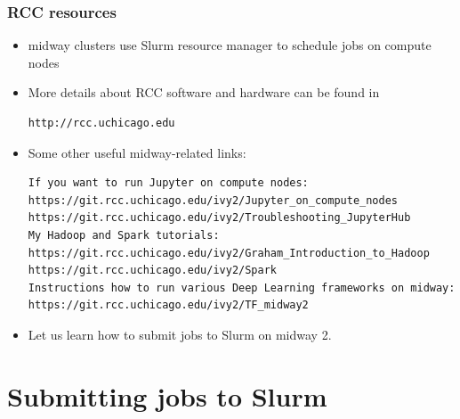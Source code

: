 \documentclass{beamer}
\begin{document}
\begin{frame}[fragile]
  \frametitle{RCC resources}
  \begin{itemize}
  \item midway clusters use {\color{mycolordef}Slurm} resource manager to schedule jobs on compute nodes
  \item More details about RCC software and hardware can be found in
    {\color{mycolorcli}
\begin{verbatim}
http://rcc.uchicago.edu
\end{verbatim}
    }
  \item Some other useful midway-related links:
{\tiny
\begin{verbatim}
If you want to run Jupyter on compute nodes:
https://git.rcc.uchicago.edu/ivy2/Jupyter_on_compute_nodes
https://git.rcc.uchicago.edu/ivy2/Troubleshooting_JupyterHub
My Hadoop and Spark tutorials:
https://git.rcc.uchicago.edu/ivy2/Graham_Introduction_to_Hadoop
https://git.rcc.uchicago.edu/ivy2/Spark
Instructions how to run various Deep Learning frameworks on midway:
https://git.rcc.uchicago.edu/ivy2/TF_midway2
\end{verbatim}
}
  \item Let us learn how to submit jobs to Slurm on midway 2.
  \end{itemize}
\end{frame}


\section{Submitting jobs to Slurm}
\end{document}
